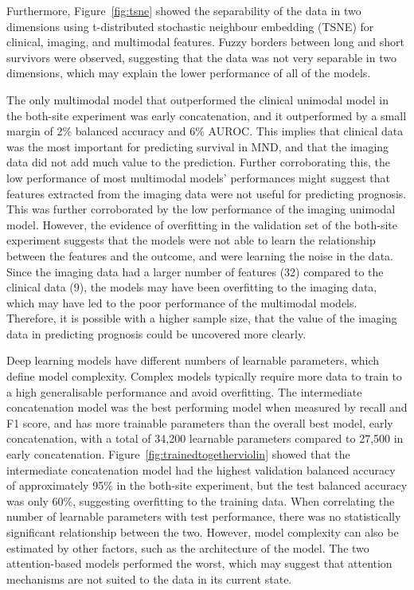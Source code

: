 Furthermore, Figure~\ref{fig:tsne} showed the separability of the data in two dimensions using t-distributed stochastic neighbour embedding (TSNE) for clinical, imaging, and multimodal features.
Fuzzy borders between long and short survivors were observed, suggesting that the data was not very separable in two dimensions, which may explain the lower performance of all of the models.

The only multimodal model that outperformed the clinical unimodal model in the both-site experiment was early concatenation, and it outperformed by a small margin of 2\% balanced accuracy and 6\% AUROC.
This implies that clinical data was the most important for predicting survival in MND, and that the imaging data did not add much value to the prediction.
Further corroborating this, the low performance of most multimodal models' performances might suggest that features extracted from the imaging data were not useful for predicting prognosis.
This was further corroborated by the low performance of the imaging unimodal model.
However, the evidence of overfitting in the validation set of the both-site experiment suggests that the models were not able to learn the relationship between the features and the outcome, and were learning the noise in the data.
Since the imaging data had a larger number of features (32) compared to the clinical data (9), the models may have been overfitting to the imaging data, which may have led to the poor performance of the multimodal models.
Therefore, it is possible with a higher sample size, that the value of the imaging data in predicting prognosis could be uncovered more clearly.

Deep learning models have different numbers of learnable parameters, which define model complexity.
Complex models typically require more data to train to a high generalisable performance and avoid overfitting.
The intermediate concatenation model was the best performing model when measured by recall and F1 score, and has more trainable parameters than the overall best model, early concatenation, with a total of 34,200 learnable parameters compared to 27,500 in early concatenation.
Figure~\ref{fig:trainedtogetherviolin} showed that the intermediate concatenation model had the highest validation balanced accuracy of approximately 95\% in the both-site experiment, but the test balanced accuracy was only 60\%, suggesting overfitting to the training data.
When correlating the number of learnable parameters with test performance, there was no statistically significant relationship between the two.
However, model complexity can also be estimated by other factors, such as the architecture of the model.
The two attention-based models performed the worst, which may suggest that attention mechanisms are not suited to the data in its current state.

